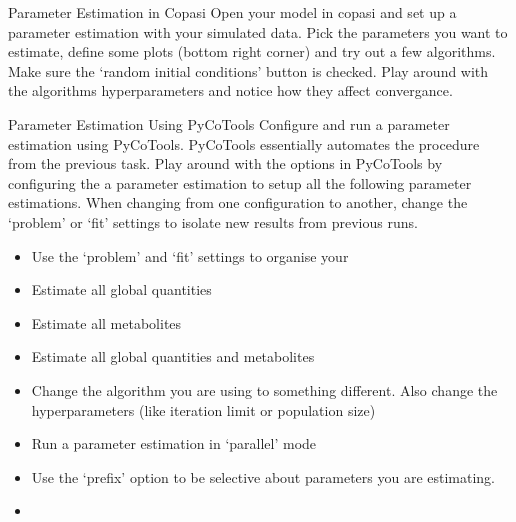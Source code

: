 \documentclass[../../main]{subfiles}
\begin{document}
\begin{Task}[label=ManualParameterEstimation]{Parameter Estimation in Copasi}
    Open your model in copasi and set up a parameter estimation with your simulated data. Pick the
    parameters you want to estimate, define some plots (bottom right corner) and try out a few algorithms.
    Make sure the `random initial conditions' button is checked. Play around with the algorithms hyperparameters and
    notice how they affect convergance.
\end{Task}

\begin{Task}[label=AutoParameterEstimation]{Parameter Estimation Using PyCoTools}
    Configure and run a parameter estimation using PyCoTools. PyCoTools essentially automates the procedure
    from the previous task.
    Play around with the options in PyCoTools by configuring the a parameter estimation to setup all the following
    parameter estimations. When changing from one configuration to another, change the `problem' or `fit' settings
    to isolate new results from previous runs.

    \begin{itemize}
        \item Use the `problem' and `fit' settings to organise your
        \item Estimate all global quantities
        \item Estimate all metabolites
        \item Estimate all global quantities and metabolites
        \item Change the algorithm you are using to something different. Also change the hyperparameters (like iteration limit or population size)
        \item Run a parameter estimation in `parallel' mode
        \item Use the `prefix' option to be selective about parameters you are estimating.
        \item {}
    \end{itemize}
\end{Task}
\end{document}
